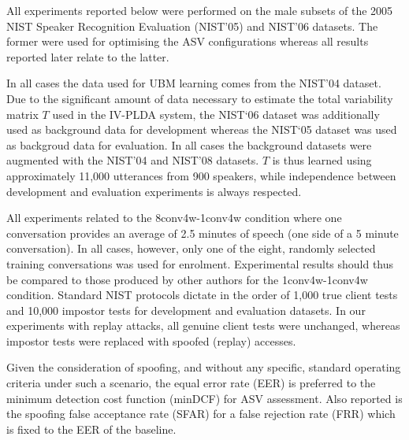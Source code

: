 
All experiments reported below were performed on the male subsets of the 2005 NIST Speaker Recognition Evaluation (NIST'05) and NIST'06 datasets.  
The former were used for optimising the ASV configurations whereas all results reported later relate to the latter.

In all cases the data used for UBM learning comes from the NIST'04 dataset.  Due to the significant amount of data necessary to estimate the total variability matrix $T$ used in the IV-PLDA system, the NIST`06 dataset was additionally used as background data for development whereas the NIST`05 dataset was used as backgroud data for evaluation. 
In all cases the background datasets were augmented with the NIST'04 and NIST'08 datasets.  $T$ is thus learned using approximately 11,000 utterances from 900 speakers, while independence between development and evaluation experiments is always respected.

All experiments related to the 8conv4w-1conv4w condition where one conversation provides an average of 2.5 minutes of speech (one side of a 5 minute conversation).  In all cases, however, only one of the eight, randomly selected training conversations was used for enrolment.  Experimental results should thus be compared to those produced by other authors for the 1conv4w-1conv4w condition. Standard NIST protocols dictate in the order of 1,000 true client tests and 10,000 impostor tests for development and evaluation datasets. In our experiments with replay attacks, all genuine client tests were unchanged, whereas impostor tests were replaced with spoofed (replay) accesses. 

Given the consideration of spoofing, and without any specific, standard operating criteria under such a scenario, the equal error rate (EER) is preferred to the minimum detection cost function (minDCF) for ASV assessment.  Also reported is the spoofing false acceptance rate (SFAR) for a false rejection rate (FRR) which is fixed to the EER of the baseline.  

